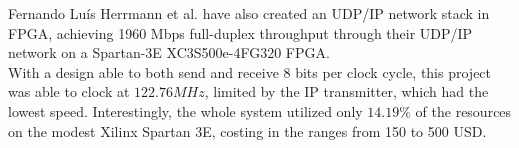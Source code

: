 Fernando Lu{\'i}s Herrmann et al. have also created an UDP/IP network stack
in FPGA, achieving 1960 Mbps full-duplex throughput through their UDP/IP
network on a Spartan-3E XC3S500e-4FG320 FPGA\cite{Herrmann2009ANU}.\\
With a design able to both send and receive 8 bits per clock cycle, this
project was able to clock at $122.76 MHz$, limited by the IP transmitter, which
had the lowest speed. Interestingly, the whole system utilized only $14.19\%$
of the resources on the modest Xilinx Spartan 3E, costing in the ranges from
150 to 500 USD\cite{spartan_3e}.





